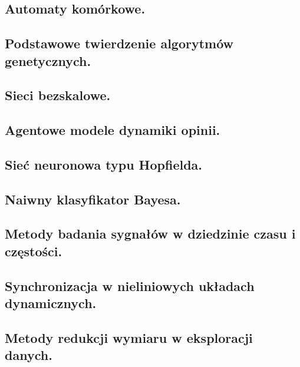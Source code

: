 \documentclass[10pt,a4paper]{article} %
\begin{document}
    \subsection{Automaty komórkowe.}
    
    
    \subsection{Podstawowe twierdzenie algorytmów genetycznych.}
    
    
    \subsection{Sieci bezskalowe.}
    
	
	\subsection{Agentowe modele dynamiki opinii.}
	
	
	\subsection{Sieć neuronowa typu Hopfielda.}
	
	
	\subsection{Naiwny klasyfikator Bayesa.}
	
	
	\subsection{Metody badania sygnałów w dziedzinie czasu i częstości.}
	
	
	\subsection{Synchronizacja w nieliniowych układach dynamicznych.}
	
	
	\subsection{Metody redukcji wymiaru w eksploracji danych.}
	
	
\end{document}
